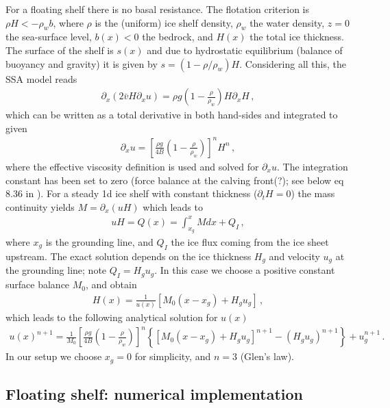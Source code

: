 \documentclass[11pt,a4paper]{article}
\newcommand{\p}{\partial}
\begin{document}
For a floating shelf there is no basal resistance. The flotation criterion is $\rho H < - \rho_w b$, where $\rho$ is the (uniform) ice shelf density, $\rho_w$ the water density, $z=0$ the sea-surface level, $b(x)<0$ the bedrock, and $H(x)$ the total ice thickness. The surface of the shelf is $s(x)$ and due to hydrostatic equilibrium (balance of buoyancy and gravity) it is given by $s = (1-\rho/\rho_w)H$. Considering all this, the SSA model reads
\begin{align}
    \p_x \left( 2 \bar{v} H \p_x u \right) = \rho g \left(1 - \frac{\rho}{\rho_w}\right) H \p_x H
    \,,
    \label{eq:SSA_1d_shelf}
\end{align}
which can be written as a total derivative in both hand-sides and integrated to given
\begin{align*}
    \p_x u = \left[ \frac{\rho g}{4 B} \left(1 - \frac{\rho}{\rho_w}\right)\right]^n H^n
    \,,
\end{align*}
where the effective viscosity definition is used and solved for $\p_x u$. The integration constant has been set to zero (force balance at the calving front(?); see below eq 8.36 in \cite{karthaus_notes}). For a steady 1d ice shelf with constant thickness ($\p_t H = 0$) the mass continuity yields $M = \p_x (u H)$ which leads to
\begin{align*}
    u H = Q(x) = \int_{x_g}^{x}M dx + Q_I\,,
\end{align*}
where $x_g$ is the grounding line, and $Q_I$ the ice flux coming from the ice sheet upstream. The exact solution depends on the ice thickness $H_g$ and velocity $u_g$ at the grounding line; note $Q_I = H_g u_g$. In this case we choose a positive constant surface balance $M_0$, and obtain
\begin{align*}
    H(x) = \frac{1}{u(x)}\left[M_0 (x-x_g) + H_g u_g \right]
    \,,
\end{align*}
which leads to the following analytical solution for $u(x)$
\begin{align*}
    u(x)^{n+1} = \frac{1}{M_0} \left[ \frac{\rho g}{4 B} \left(1 - \frac{\rho}{\rho_w}\right)\right]^n 
        \left\{
        \left[ M_0 (x-x_g) + H_g u_g \right]^{n+1} 
        - (H_g u_g)^{n+1}
        \right\}
        + u_g^{n+1}
        \,.
\end{align*}
In our setup we choose $x_g=0$ for simplicity, and $n=3$ (Glen's law).

\subsection{Floating shelf: numerical implementation}
\end{document}
